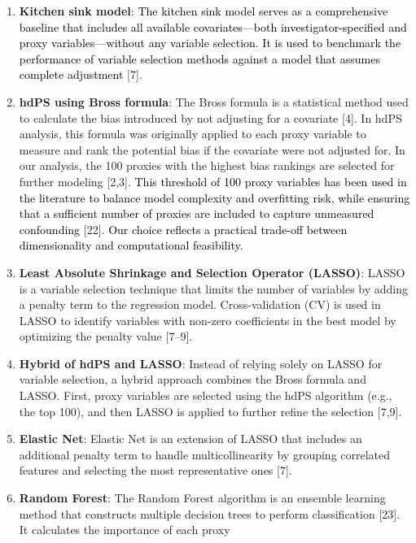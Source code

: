 \documentclass[10pt,letterpaper]{article}
\begin{document}
\begin{enumerate}
\def\labelenumi{\arabic{enumi}.}
\item
  \textbf{Kitchen sink model}:
  \textcolor{black}{The kitchen sink model serves as a comprehensive baseline that includes all available covariates—both investigator-specified and proxy variables—without any variable selection. It is used to benchmark the performance of variable selection methods against a model that assumes complete adjustment}
  {[}7{]}.
\item
  \textbf{hdPS using Bross formula}: The Bross formula is a statistical
  method used to calculate the bias introduced by not adjusting for a
  covariate {[}4{]}. In hdPS analysis, this formula was originally
  applied to each proxy variable to measure and rank the potential bias
  if the covariate were not adjusted for. In our analysis, the 100
  proxies with the highest bias rankings are selected for further
  modeling {[}2,3{]}.
  \textcolor{black}{This threshold of 100 proxy variables has been used in the literature to balance model complexity and overfitting risk, while ensuring that a sufficient number of proxies are included to capture unmeasured confounding}
  {[}22{]}.
  \textcolor{black}{Our choice reflects a practical trade-off between dimensionality and computational feasibility.}
\item
  \textbf{Least Absolute Shrinkage and Selection Operator (LASSO)}:
  LASSO is a variable selection technique that limits the number of
  variables by adding a penalty term to the regression model.
  Cross-validation (CV) is used in LASSO to identify variables with
  non-zero coefficients in the best model by optimizing the penalty
  value {[}7--9{]}.
\item
  \textbf{Hybrid of hdPS and LASSO}: Instead of relying solely on LASSO
  for variable selection, a hybrid approach combines the Bross formula
  and LASSO. First, proxy variables are selected using the hdPS
  algorithm (e.g., the top 100), and then LASSO is applied to further
  refine the selection {[}7,9{]}.
\item
  \textbf{Elastic Net}: Elastic Net is an extension of LASSO that
  includes an additional penalty term to handle multicollinearity by
  grouping correlated features and selecting the most representative
  ones {[}7{]}.
\item
  \textbf{Random Forest}: The Random Forest algorithm is an ensemble
  learning method that constructs multiple decision trees to perform
  classification {[}23{]}. It calculates the importance of each proxy

\end{enumerate}
\end{document}
